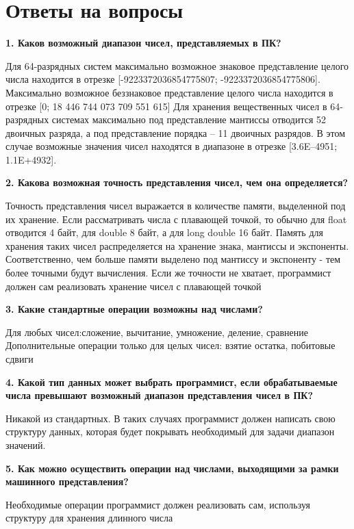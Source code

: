 \section{Ответы на вопросы}
\noindent\textbf{1. Каков возможный диапазон чисел, представляемых в ПК?}\par
Для 64-разрядных систем максимально возможное знаковое представление целого числа находится в отрезке [-9223372036854775807; -9223372036854775806]. Максимально возможное беззнаковое представление целого числа находится в отрезке [0; 18 446 744 073 709 551 615]
Для хранения вещественных чисел в 64-разрядных системах максимально под представление мантиссы отводится 52 двоичных разряда, а под представление порядка – 11 двоичных разрядов. В этом случае возможные значения чисел находятся в диапазоне в отрезке [3.6E–4951; 1.1E+4932].\newline

\noindent\textbf{2. Какова возможная точность представления чисел, чем она определяется?}\par
Точность представления чисел выражается в количестве памяти, выделенной под их хранение. Если рассматривать числа с плавающей точкой, то обычно для float отводится 4 байт, для double 8 байт, а для long double 16 байт. Память для хранения таких чисел распределяется на хранение знака, мантиссы и экспоненты. Соответственно, чем больше памяти выделено под мантиссу и экспоненту - тем более точными будут вычисления. Если же точности не хватает, программист должен сам реализовать хранение чисел с плавающей точкой\newline

\noindent\textbf{3. Какие стандартные операции возможны над числами?}\par
Для любых чисел:сложение, вычитание, умножение, деление, сравнение
Дополнительные операции только для целых чисел: взятие остатка, побитовые сдвиги\newline

\noindent\textbf{4. Какой тип данных может выбрать программист, если обрабатываемые
	числа превышают возможный диапазон представления чисел в ПК?}\par
Никакой из стандартных. В таких случаях программист должен написать свою структуру данных, которая будет покрывать необходимый для задачи диапазон значений.

\noindent\textbf{5. Как можно осуществить операции над числами, выходящими за
	рамки машинного представления?}\par
Необходимые операции программист должен реализовать сам, используя структуру для хранения длинного числа